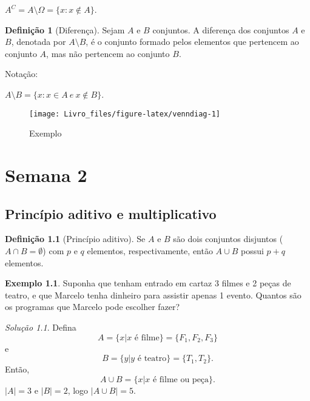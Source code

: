 \documentclass[]{book}
\theoremstyle{definition}
\newtheorem{definition}{Definição}[chapter]
\theoremstyle{definition}
\newtheorem{example}{Exemplo}[chapter]
\theoremstyle{definition}
\theoremstyle{remark}
\newtheorem*{solution}{Solução}
\begin{document}
\(A^C = A \setminus \Omega = \{x : x \notin A\}\).

\begin{definition}[Diferença]
\protect\hypertarget{def:defdifer}{}{\label{def:defdifer} \iffalse (Diferença) \fi{} }Sejam \(A\) e \(B\) conjuntos. A diferença dos conjuntos \(A\) e \(B\), denotada por \(A \setminus B\), é o conjunto formado pelos elementos que pertencem ao conjunto \(A\), mas não pertencem ao conjunto \(B\).
\end{definition}

Notação:

\(A \setminus B = \{x : x \in A \ e \ x \notin B\}\).

\begin{figure}

{\centering \texttt{[image: Livro\_files/figure-latex/venndiag-1]} 

}

\caption{Exemplo}\label{fig:venndiag}
\end{figure}

\hypertarget{sem2}{%
\chapter{Semana 2}\label{sem2}}

\hypertarget{princuxedpio-aditivo-e-multiplicativo}{%
\section{Princípio aditivo e multiplicativo}\label{princuxedpio-aditivo-e-multiplicativo}}

\begin{definition}[Princípio aditivo]
\protect\hypertarget{def:defAaditivo}{}{\label{def:defAaditivo} \iffalse (Princípio aditivo) \fi{} }Se \(A\) e \(B\) são dois conjuntos disjuntos (\(A \cap B = \emptyset\)) com \(p\) e \(q\) elementos, respectivamente, então \(A \cup B\) possui \(p + q\) elementos.
\end{definition}

\begin{example}
\protect\hypertarget{exm:unnamed-chunk-16}{}{\label{exm:unnamed-chunk-16} }Suponha que tenham entrado em cartaz 3 filmes e 2 peças de teatro, e que Marcelo tenha dinheiro para assistir apenas 1 evento.
Quantos são os programas que Marcelo pode escolher fazer?
\end{example}

\begin{solution}
\iffalse{} {Solução. } \fi{}Defina \[A = \{x \vert x \text{ é filme}\} = \{F_1, F_2, F_3\}\]
e
\[B = \{y \vert y \text{ é teatro}\} = \{T_1, T_2\}.\]
Então,
\[A \cup B = \{x \vert x \text{ é filme ou peça}\}.\]
\(\vert A \vert = 3\) e \(\vert B \vert = 2\), logo \(\vert A \cup B \vert = 5\).
\end{solution}
\end{document}
